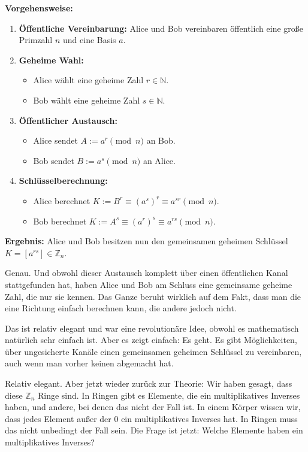 \begin{math-stroke}
\textbf{Vorgehensweise:}
\begin{enumerate}[label=\textbf{(\arabic*)}]
    \item \textbf{Öffentliche Vereinbarung:} Alice und Bob vereinbaren öffentlich eine große Primzahl $n$ und eine Basis $a$.
    \item \textbf{Geheime Wahl:}
    \begin{itemize}
        \item Alice wählt eine geheime Zahl $r \in \mathbb{N}$.
        \item Bob wählt eine geheime Zahl $s \in \mathbb{N}$.
    \end{itemize}
    \item \textbf{Öffentlicher Austausch:}
    \begin{itemize}
        \item Alice sendet $A := a^r \pmod n$ an Bob.
        \item Bob sendet $B := a^s \pmod n$ an Alice.
    \end{itemize}
    \item \textbf{Schlüsselberechnung:}
    \begin{itemize}
        \item Alice berechnet $K := B^r \equiv (a^s)^r \equiv a^{sr} \pmod n$.
        \item Bob berechnet $K := A^s \equiv (a^r)^s \equiv a^{rs} \pmod n$.
    \end{itemize}
\end{enumerate}

\textbf{Ergebnis:} Alice und Bob besitzen nun den gemeinsamen geheimen Schlüssel $K = [a^{rs}] \in \mathbb{Z}_n$.
\end{math-stroke}

\begin{spoken-clean}[00:26:59 - 00:29:03]
Genau. Und obwohl dieser Austausch komplett über einen öffentlichen Kanal stattgefunden hat, haben Alice und Bob am Schluss eine gemeinsame geheime Zahl, die nur sie kennen. Das Ganze beruht wirklich auf dem Fakt, dass man die eine Richtung einfach berechnen kann, die andere jedoch nicht.

Das ist relativ elegant und war eine revolutionäre Idee, obwohl es mathematisch natürlich sehr einfach ist. Aber es zeigt einfach: Es geht. Es gibt Möglichkeiten, über ungesicherte Kanäle einen gemeinsamen geheimen Schlüssel zu vereinbaren, auch wenn man vorher keinen abgemacht hat.

Relativ elegant. Aber jetzt wieder zurück zur Theorie: Wir haben gesagt, dass diese $\mathbb{Z}_n$ Ringe sind. In Ringen gibt es Elemente, die ein multiplikatives Inverses haben, und andere, bei denen das nicht der Fall ist. In einem Körper wissen wir, dass jedes Element außer der $0$ ein multiplikatives Inverses hat. In Ringen muss das nicht unbedingt der Fall sein. Die Frage ist jetzt: Welche Elemente haben ein multiplikatives Inverses?
\end{spoken-clean}

